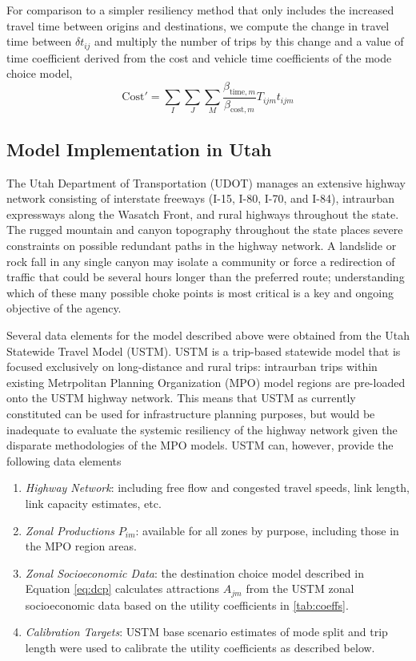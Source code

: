 \documentclass[3p, authoryear]{elsarticle} %
\providecommand{\tightlist}{%
  \setlength{\itemsep}{0pt}\setlength{\parskip}{0pt}}
\begin{document}
For comparison to a simpler resiliency method that only includes the increased
travel time between origins and destinations, we compute the change in travel
time between \(\delta t_{ij}\) and multiply the number of trips by this change
and a value of time coefficient derived from the cost and vehicle time coefficients
of the mode choice model,
\begin{equation}
\mathrm{Cost}' =  \sum_I \sum_J \sum_M \frac{\beta_{\mathrm{time}, m} }{\beta_{\mathrm{cost}, m}} T_{ijm} t_{ijm}
  \label{eq:ttmethod}
\end{equation}

\hypertarget{model-implementation-in-utah}{%
\subsection{Model Implementation in Utah}\label{model-implementation-in-utah}}

The Utah Department of Transportation (UDOT) manages an extensive highway
network consisting of interstate freeways (I-15, I-80, I-70, and I-84),
intraurban expressways along the Wasatch Front, and rural highways throughout
the state. The rugged mountain and canyon topography throughout the state places
severe constraints on possible redundant paths in the highway network. A
landslide or rock fall in any single canyon may isolate a community or force a
redirection of traffic that could be several hours longer than the preferred
route; understanding which of these many possible choke points is most critical is a key
and ongoing objective of the agency.

Several data elements for the model described above were obtained from the Utah
Statewide Travel Model (USTM). USTM is a trip-based statewide model that is
focused exclusively on long-distance and rural trips: intraurban trips within
existing Metrpolitan Planning Organization (MPO) model regions are pre-loaded
onto the USTM highway network. This means that USTM as currently constituted can
be used for infrastructure planning purposes, but would be inadequate to
evaluate the systemic resiliency of the highway network given the disparate
methodologies of the MPO models. USTM can, however, provide the following
data elements

\begin{enumerate}
\def\labelenumi{\arabic{enumi}.}
\tightlist
\item
  \emph{Highway Network}: including free flow and congested travel speeds,
  link length, link capacity estimates, etc.
\item
  \emph{Zonal Productions} \(P_{im}\): available for all zones by purpose,
  including those in the MPO region areas.
\item
  \emph{Zonal Socioeconomic Data}: the destination choice model described in
  Equation \eqref{eq:dcp} calculates attractions \(A_{jm}\) from the USTM zonal
  socioeconomic data based on the utility coefficients in \ref{tab:coeffs}.
\item
  \emph{Calibration Targets}: USTM base scenario estimates of mode split and
  trip length were used to calibrate the utility coefficients as described
  below.
\end{enumerate}
\end{document}
